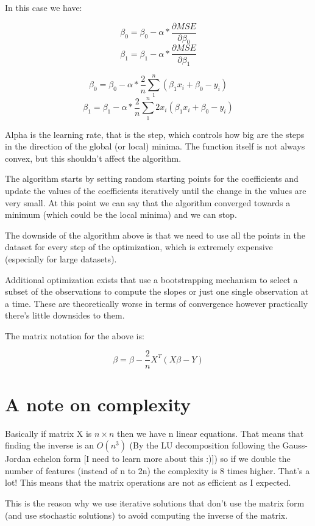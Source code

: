 \documentclass[12pt,a4paper]{article}
\begin{document}
In this case we have: 

$$\beta_{0} = \beta_{0} - \alpha * \frac{\partial{MSE}}{\partial{\beta_{0}}}$$
$$\beta_{1} = \beta_{1} - \alpha * \frac{\partial{MSE}}{\partial{\beta_{1}}}$$

$$\beta_{0} = \beta_{0} - \alpha * \frac{2}{n} \sum_{1}^{n}(\beta_{1}x_{i} + \beta_{0} - y_{i})$$
$$\beta_{1} = \beta_{1} - \alpha * \frac{2}{n} \sum_{1}^{n}2x_{i}(\beta_{1}x_{i} + \beta_{0} - y_{i})$$

Alpha is the learning rate, that is the step, which controls how big are the steps in the direction of the global (or local) minima. The function itself is not always convex, but this shouldn't affect the algorithm. 

The algorithm starts by setting random starting points for the coefficients and update the values of the coefficients iteratively until the change in the values are very small. At this point we can say that the algorithm converged towards a minimum (which could be the local minima) and we can stop.

The downside of the algorithm above is that we need to use all the points in the dataset for every step of the optimization, which is extremely expensive (especially for large datasets). 

Additional optimization exists that use a bootstrapping mechanism to select a subset of the observations to compute the slopes or just one single observation at a time. These are theoretically worse in terms of convergence however practically there's little downsides to them.

The matrix notation for the above is:

$$\beta = \beta - \frac{2}{n}X^{T}(X\beta - Y)$$

\section{A note on complexity}
Basically if matrix X is $n \times n$ then we have n linear equations. That means that finding the inverse is an $O(n^3)$ (By the LU decomposition following the Gauss-Jordan echelon form [I need to learn more about this :)]) so if we double the number of features (instead of n to 2n) the complexity is 8 times higher. That's a lot! This means that the matrix operations are not as efficient as I expected.

This is the reason why we use iterative solutions that don't use the matrix form (and use stochastic solutions) to avoid computing the inverse of the matrix.
\end{document}
